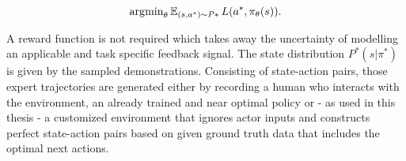\begin{equation}
\operatorname{\arg\!\min}_\theta \operatorname{\mathbb{E}}_{(s,a^*) \sim P*} L(a^*, \pi_\theta(s)).
\end{equation}

A reward function is not required which takes away the uncertainty of modelling an applicable and task specific feedback signal. The state distribution $P^*(s|\pi^*)$ is given by the sampled demonstrations. Consisting of state-action pairs, those expert trajectories are generated either by recording a human who interacts with the environment, an already trained and near optimal policy or - as used in this thesis - a customized environment that ignores actor inputs and constructs perfect state-action pairs based on given ground truth data that includes the optimal next actions.